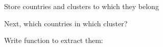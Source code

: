 \documentclass[ignorenonframetext,]{beamer}
\newenvironment{Shaded}{\begin{snugshade}}{\end{snugshade}}
\newcommand{\ControlFlowTok}[1]{\textcolor[rgb]{0.13,0.29,0.53}{\textbf{#1}}}
\newcommand{\DataTypeTok}[1]{\textcolor[rgb]{0.13,0.29,0.53}{#1}}
\newcommand{\FloatTok}[1]{\textcolor[rgb]{0.00,0.00,0.81}{#1}}
\newcommand{\KeywordTok}[1]{\textcolor[rgb]{0.13,0.29,0.53}{\textbf{#1}}}
\newcommand{\NormalTok}[1]{#1}
\newcommand{\OperatorTok}[1]{\textcolor[rgb]{0.81,0.36,0.00}{\textbf{#1}}}
\newcommand{\StringTok}[1]{\textcolor[rgb]{0.31,0.60,0.02}{#1}}
\begin{document}
\begin{frame}[fragile]{Store countries and clusters to which they
belong}
\protect\hypertarget{store-countries-and-clusters-to-which-they-belong}{}

\begin{Shaded}
\end{Shaded}

Next, which countries in which cluster?

Write function to extract them:

\begin{Shaded}
\end{Shaded}

\end{frame}
\end{document}
